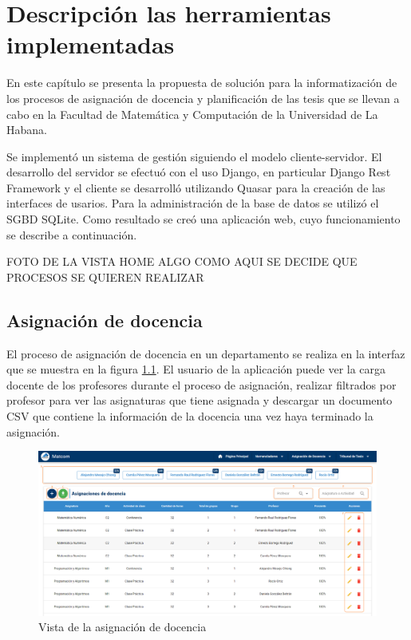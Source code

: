 \chapter{Descripción las herramientas implementadas}\label{chapter:implementation}
En este capítulo se presenta la propuesta de solución para 
la informatización de los procesos de asignación de docencia y 
planificación de las tesis que se llevan a cabo 
en la Facultad de Matemática y Computación de la Universidad de La Habana. 

Se implementó un sistema de gestión siguiendo el modelo cliente-servidor. El desarrollo del servidor se efectuó con el uso Django, en 
particular Django Rest Framework y el cliente se desarrolló utilizando
Quasar para la creación de las interfaces de usarios. Para la administración de la 
base de datos se utilizó el SGBD SQLite. Como resultado se creó una 
aplicación web, cuyo funcionamiento se describe a continuación.

FOTO DE LA VISTA HOME 
ALGO COMO AQUI SE DECIDE QUE PROCESOS SE QUIEREN REALIZAR




\section{Asignación de docencia}



El proceso de asignación de docencia en un departamento se realiza en la 
interfaz que se muestra en la figura \ref{img-ta-done}. El usuario de la 
aplicación puede ver la carga docente de los profesores durante el proceso 
de asignación, realizar filtrados por profesor para ver las asignaturas 
que tiene asignada y descargar un documento CSV que contiene la información 
de la docencia una vez haya terminado la asignación.


\begin{figure}[H]
    \includegraphics[scale=0.3]{Graphics/Implementation/Docencia/AD-asignada.png}
    \caption{Vista de la asignación de docencia}
    \label{img-ta-done}
\end{figure}

